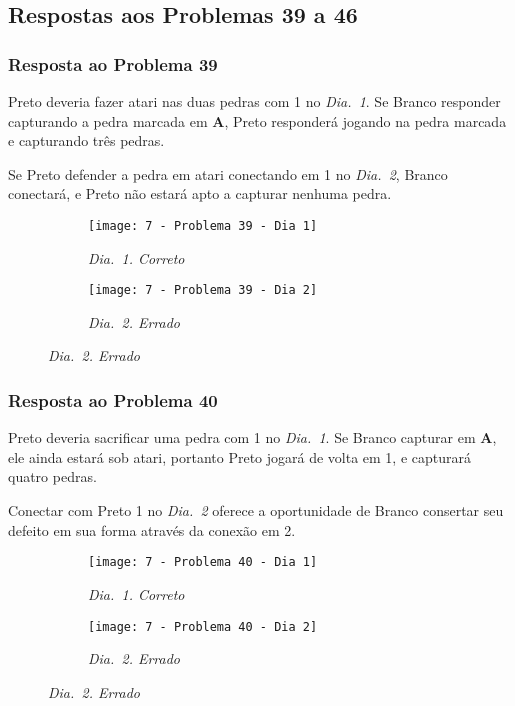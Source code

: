 \pagebreak

\subsection{Respostas aos Problemas 39 a 46}

\subsubsection*{Resposta ao Problema 39}

Preto deveria fazer atari nas duas pedras com 1 no \emph{Dia.\@~1}. Se Branco responder capturando a pedra marcada em \textbf{A}, Preto responderá jogando na pedra marcada e capturando três pedras.
    
Se Preto defender a pedra em atari conectando em 1 no \emph{Dia.\@~2}, Branco conectará, e Preto não estará apto a capturar nenhuma pedra.

\begin{figure}[h!]
    \centering
    \begin{subfigure}[t]{.31\textwidth}
        \texttt{[image: 7 - Problema 39 - Dia 1]}
        \caption*{\emph{Dia.\@~1. Correto}}
    \end{subfigure}
    \hspace{1cm}
    \begin{subfigure}[t]{.31\textwidth}
        \texttt{[image: 7 - Problema 39 - Dia 2]}
        \caption*{\emph{Dia.\@~2. Errado}}
    \end{subfigure}
\end{figure}

\subsubsection*{Resposta ao Problema 40}

Preto deveria sacrificar uma pedra com 1 no \emph{Dia.\@~1}. Se Branco capturar em \textbf{A}, ele ainda estará sob atari, portanto Preto jogará de volta em 1, e capturará quatro pedras.
    
Conectar com Preto 1 no \emph{Dia.\@~2} oferece a oportunidade de Branco consertar seu defeito em sua forma através da conexão em 2.

\begin{figure}[h!]
    \centering
    \begin{subfigure}[t]{.31\textwidth}
        \texttt{[image: 7 - Problema 40 - Dia 1]}
        \caption*{\emph{Dia.\@~1. Correto}}
    \end{subfigure}
    \hspace{1cm}
    \begin{subfigure}[t]{.31\textwidth}
        \texttt{[image: 7 - Problema 40 - Dia 2]}
        \caption*{\emph{Dia.\@~2. Errado}}
    \end{subfigure}
\end{figure}

